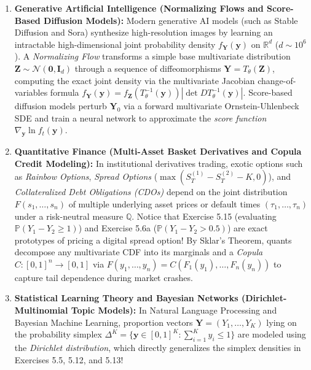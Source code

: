 \documentclass[11pt, letterpaper]{article}
\theoremstyle{definition}
\theoremstyle{remark}
\begin{document}
\begin{enumerate}[label=\textbf{Scenario \arabic*:}, leftmargin=1in]
    \item \textbf{Generative Artificial Intelligence (Normalizing Flows and Score-Based Diffusion Models):}
    Modern generative AI models (such as Stable Diffusion and Sora) synthesize high-resolution images by learning an intractable high-dimensional joint probability density $f_{\mathbf{Y}}(\mathbf{y})$ on $\mathbb{R}^d$ ($d \sim 10^6$). A \emph{Normalizing Flow} transforms a simple base multivariate distribution $\mathbf{Z} \sim \mathcal{N}(\mathbf{0}, \mathbf{I}_d)$ through a sequence of diffeomorphisms $\mathbf{Y} = T_\theta(\mathbf{Z})$, computing the exact joint density via the multivariate Jacobian change-of-variables formula $f_{\mathbf{Y}}(\mathbf{y}) = f_{\mathbf{Z}}(T_\theta^{-1}(\mathbf{y})) \left|\det D T_\theta^{-1}(\mathbf{y})\right|$. Score-based diffusion models perturb $\mathbf{Y}_0$ via a forward multivariate Ornstein-Uhlenbeck SDE and train a neural network to approximate the \emph{score function} $\nabla_{\mathbf{y}} \ln f_t(\mathbf{y})$.
    \item \textbf{Quantitative Finance (Multi-Asset Basket Derivatives and Copula Credit Modeling):}
    In institutional derivatives trading, exotic options such as \emph{Rainbow Options}, \emph{Spread Options} ($\max(S_T^{(1)} - S_T^{(2)} - K, 0)$), and \emph{Collateralized Debt Obligations (CDOs)} depend on the joint distribution $F(s_1, \dots, s_n)$ of multiple underlying asset prices or default times $(\tau_1, \dots, \tau_n)$ under a risk-neutral measure $\mathbb{Q}$. Notice that Exercise 5.15 (evaluating $\mathbb{P}(Y_1 - Y_2 \ge 1)$) and Exercise 5.6a ($\mathbb{P}(Y_1 - Y_2 > 0.5)$) are exact prototypes of pricing a digital spread option! By Sklar's Theorem, quants decompose any multivariate CDF into its marginals and a \emph{Copula} $C : [0,1]^n \to [0,1]$ via $F(y_1, \dots, y_n) = C(F_1(y_1), \dots, F_n(y_n))$ to capture tail dependence during market crashes.
    \item \textbf{Statistical Learning Theory and Bayesian Networks (Dirichlet-Multinomial Topic Models):}
    In Natural Language Processing and Bayesian Machine Learning, proportion vectors $\mathbf{Y} = (Y_1, \dots, Y_K)$ lying on the probability simplex $\Delta^K = \{\mathbf{y} \in [0,1]^K : \sum_{i=1}^K y_i \le 1\}$ are modeled using the \emph{Dirichlet distribution}, which directly generalizes the simplex densities in Exercises 5.5, 5.12, and 5.13!
\end{enumerate}
\end{document}

